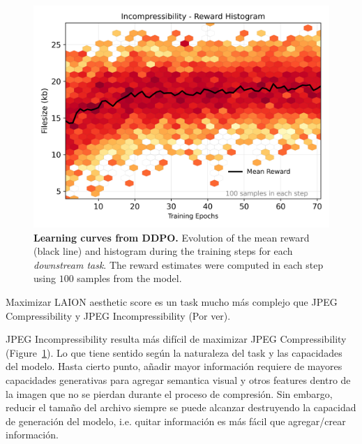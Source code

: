 \begin{figure}[ht]
\begin{minipage}{0.5\textwidth}
  \end{minipage}\hfill
  \begin{minipage}{0.5\textwidth}
      \centering
      \includegraphics[width=1\textwidth]{img/results/reward_hist-jpeg-incompressibility.png} %
  \end{minipage}
  \vspace{-8pt}  %
    \captionsetup{width=\textwidth} %
    \caption{\textbf{Learning curves from DDPO.} Evolution of the mean reward (black line) and histogram during the training steps for each \textit{downstream task}. The reward estimates were computed in each step using $100$ samples from the model.}
  \label{fig:reward_hist} %
\end{figure}

Maximizar LAION aesthetic score es un task mucho más complejo que JPEG Compressibility y JPEG Incompressibility (Por ver).

JPEG Incompressibility resulta más difícil de maximizar JPEG Compressibility
(Figure~\ref{fig:reward_hist}). Lo que tiene sentido según la naturaleza del
task y las capacidades del modelo. Hasta cierto punto, añadir mayor información 
requiere de mayores capacidades generativas para agregar semantica visual y 
otros features dentro de la imagen que no se pierdan durante el proceso de
compresión. Sin embargo, reducir el tamaño del archivo siempre se puede
alcanzar destruyendo la capacidad de generación del modelo, i.e. quitar
información es más fácil que agregar/crear información.

